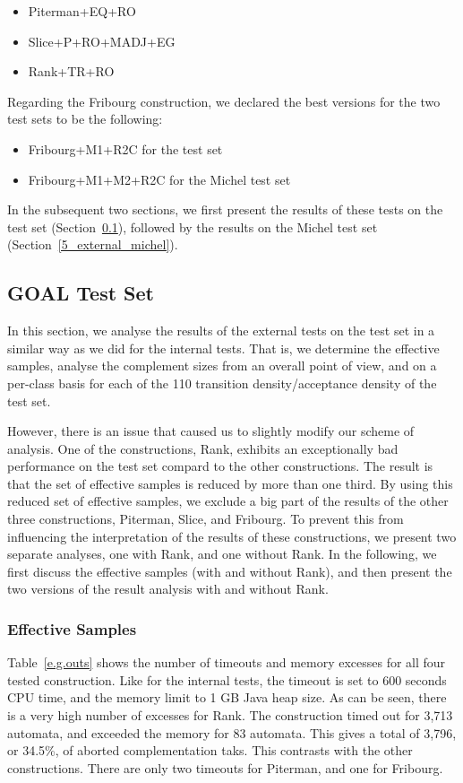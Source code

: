 \begin{itemize}
\item Piterman+EQ+RO
\item Slice+P+RO+MADJ+EG
\item Rank+TR+RO
\end{itemize}

Regarding the Fribourg construction, we declared the best versions for the two test sets to be the following:

\begin{itemize}
\item Fribourg+M1+R2C    \tabto{4.2cm} for the \goal{} test set
\item Fribourg+M1+M2+R2C \tabto{4.2cm} for the Michel test set
\end{itemize}

In the subsequent two sections, we first present the results of these tests on the \goal{} test set (Section~\ref{5_external_goal}), followed by the results on the Michel test set (Section~\ref{5_external_michel}).


\subsection{GOAL Test Set}
\label{5_external_goal}
In this section, we analyse the results of the external tests on the \goal{} test set in a similar way as we did for the internal tests. That is, we determine the effective samples, analyse the complement sizes from an overall point of view, and on a per-class basis for each of the 110 transition density/acceptance density of the \goal{} test set.

However, there is an issue that caused us to slightly modify our scheme of analysis. One of the constructions, Rank, exhibits an exceptionally bad performance on the \goal{} test set compard to the other constructions. The result is that the set of effective samples is reduced by more than one third. By using this reduced set of effective samples, we exclude a big part of the results of the other three constructions, Piterman, Slice, and Fribourg. To prevent this from influencing the interpretation of the results of these constructions, we present two separate analyses, one with Rank, and one without Rank. In the following, we first discuss the effective samples (with and without Rank), and then present the two versions of the result analysis with and without Rank. 


\subsubsection{Effective Samples}
Table~\ref{e.g.outs} shows the number of timeouts and memory excesses for all four tested construction. Like for the internal tests, the timeout is set to 600 seconds CPU time, and the memory limit to 1 GB Java heap size. As can be seen, there is a very high number of excesses for Rank. The construction timed out for 3,713 automata, and exceeded the memory for 83 automata. This gives a total of 3,796, or 34.5\%, of aborted complementation taks. This contrasts with the other constructions. There are only two timeouts for Piterman, and one for Fribourg.

